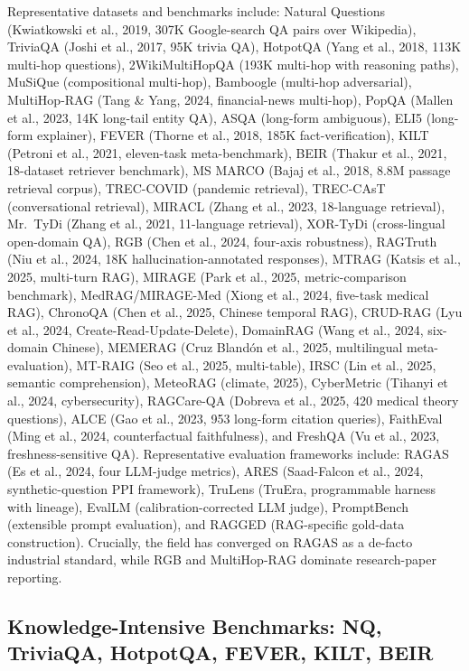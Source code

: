 \documentclass{article}
\begin{document}
Representative datasets and benchmarks include: Natural Questions (Kwiatkowski et al., 2019, 307K Google-search QA pairs over Wikipedia), TriviaQA (Joshi et al., 2017, 95K trivia QA), HotpotQA (Yang et al., 2018, 113K multi-hop questions), 2WikiMultiHopQA (193K multi-hop with reasoning paths), MuSiQue (compositional multi-hop), Bamboogle (multi-hop adversarial), MultiHop-RAG (Tang \& Yang, 2024, financial-news multi-hop), PopQA (Mallen et al., 2023, 14K long-tail entity QA), ASQA (long-form ambiguous), ELI5 (long-form explainer), FEVER (Thorne et al., 2018, 185K fact-verification), KILT (Petroni et al., 2021, eleven-task meta-benchmark), BEIR (Thakur et al., 2021, 18-dataset retriever benchmark), MS MARCO (Bajaj et al., 2018, 8.8M passage retrieval corpus), TREC-COVID (pandemic retrieval), TREC-CAsT (conversational retrieval), MIRACL (Zhang et al., 2023, 18-language retrieval), Mr.~TyDi (Zhang et al., 2021, 11-language retrieval), XOR-TyDi (cross-lingual open-domain QA), RGB (Chen et al., 2024, four-axis robustness), RAGTruth (Niu et al., 2024, 18K hallucination-annotated responses), MTRAG (Katsis et al., 2025, multi-turn RAG), MIRAGE (Park et al., 2025, metric-comparison benchmark), MedRAG/MIRAGE-Med (Xiong et al., 2024, five-task medical RAG), ChronoQA (Chen et al., 2025, Chinese temporal RAG), CRUD-RAG (Lyu et al., 2024, Create-Read-Update-Delete), DomainRAG (Wang et al., 2024, six-domain Chinese), MEMERAG (Cruz Blandón et al., 2025, multilingual meta-evaluation), MT-RAIG (Seo et al., 2025, multi-table), IRSC (Lin et al., 2025, semantic comprehension), MeteoRAG (climate, 2025), CyberMetric (Tihanyi et al., 2024, cybersecurity), RAGCare-QA (Dobreva et al., 2025, 420 medical theory questions), ALCE (Gao et al., 2023, 953 long-form citation queries), FaithEval (Ming et al., 2024, counterfactual faithfulness), and FreshQA (Vu et al., 2023, freshness-sensitive QA). Representative evaluation frameworks include: RAGAS (Es et al., 2024, four LLM-judge metrics), ARES (Saad-Falcon et al., 2024, synthetic-question PPI framework), TruLens (TruEra, programmable harness with lineage), EvalLM (calibration-corrected LLM judge), PromptBench (extensible prompt evaluation), and RAGGED (RAG-specific gold-data construction). Crucially, the field has converged on RAGAS as a de-facto industrial standard, while RGB and MultiHop-RAG dominate research-paper reporting.

\subsection{Knowledge-Intensive Benchmarks: NQ, TriviaQA, HotpotQA, FEVER, KILT, BEIR}\label{knowledge-intensive-benchmarks-nq-triviaqa-hotpotqa-fever-kilt-beir}
\end{document}
